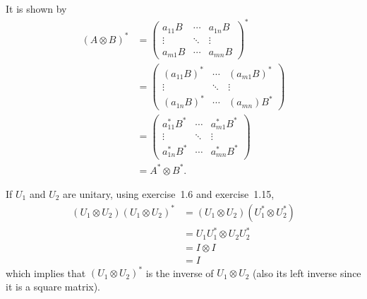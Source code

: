 \begin{solution}
  It is shown by
  \begin{align*}
    (A \otimes B)^*
    & =
    \begin{pmatrix}
      a_{11}B & \cdots & a_{1n}B\\
      \vdots  & \ddots & \vdots\\
      a_{m1}B & \cdots & a_{mn}B
    \end{pmatrix}^*\\
    & =
    \begin{pmatrix}
      (a_{11}B)^* & \cdots & (a_{m1}B)^*\\
      \vdots  & \ddots & \vdots\\
      (a_{1n}B)^* & \cdots & (a_{mn})B^*
    \end{pmatrix}\\
    & =
    \begin{pmatrix}
      a_{11}^*B^* & \cdots & a_{m1}^*B^*\\
      \vdots  & \ddots & \vdots\\
      a_{1n}^*B^* & \cdots & a_{mn}^*B^*
    \end{pmatrix}\\
    & =
    A^* \otimes B^*.
  \end{align*}
\end{solution}

\begin{solution}
  If $U_1$ and $U_2$ are unitary,
  using exercise~1.6 and exercise~1.15,
  \begin{align*}
    (U_1 \otimes U_2) (U_1 \otimes U_2)^*
    & = (U_1 \otimes U_2) (U_1^* \otimes U_2^*)\\
    & = U_1U_1^* \otimes U_2U_2^*\\
    & = I \otimes I\\
    & = I
  \end{align*}
  which implies that $(U_1 \otimes U_2)^*$
  is the inverse of $U_1 \otimes U_2$
  (also its left inverse since it is a square matrix).
\end{solution}


